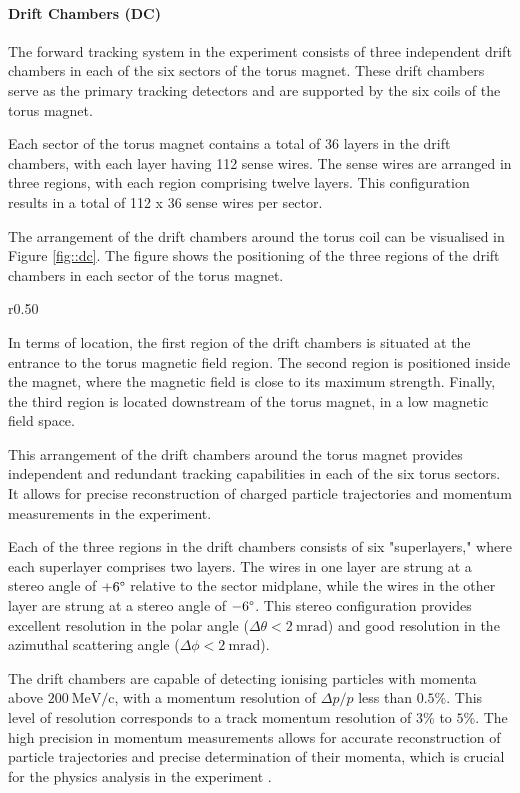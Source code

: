 \paragraph{Drift Chambers (DC)}
\label{par::dc}
    The forward tracking system in the experiment consists of three independent drift chambers in each of the six sectors of the torus magnet.
    These drift chambers serve as the primary tracking detectors and are supported by the six coils of the torus magnet.

    Each sector of the torus magnet contains a total of 36 layers in the drift chambers, with each layer having 112 sense wires.
    The sense wires are arranged in three regions, with each region comprising twelve layers.
    This configuration results in a total of 112 x 36 sense wires per sector.

    The arrangement of the drift chambers around the torus coil can be visualised in Figure \ref{fig::dc}.
    The figure shows the positioning of the three regions of the drift chambers in each sector of the torus magnet.

    \begin{wrapfigure}{r}{0.50\textwidth}
        \centering{}
        \caption[DC]{Drift Chambers render.
        Each of the DC regions are denoted as R1, R2, and R3 in the figure.
        Source: \hyperlink{jlab.org/physics/hall-b/clas12}{CLAS12 wiki}.}
        \label{fig::dc}
    \end{wrapfigure}

    In terms of location, the first region of the drift chambers is situated at the entrance to the torus magnetic field region.
    The second region is positioned inside the magnet, where the magnetic field is close to its maximum strength.
    Finally, the third region is located downstream of the torus magnet, in a low magnetic field space.

    This arrangement of the drift chambers around the torus magnet provides independent and redundant tracking capabilities in each of the six torus sectors.
    It allows for precise reconstruction of charged particle trajectories and momentum measurements in the experiment.

    Each of the three regions in the drift chambers consists of six "superlayers," where each superlayer comprises two layers.
    The wires in one layer are strung at a stereo angle of $+6\degree$ relative to the sector midplane, while the wires in the other layer are strung at a stereo angle of $-6\degree$.
    This stereo configuration provides excellent resolution in the polar angle ($\Delta\theta < 2 ~\text{mrad}$) and good resolution in the azimuthal scattering angle ($\Delta\phi < 2 ~\text{mrad}$).

    The drift chambers are capable of detecting ionising particles with momenta above $200 ~\text{MeV}/\text{c}$, with a momentum resolution of $\Delta p/p$ less than $0.5\%$. This level of resolution corresponds to a track momentum resolution of $3\%$ to $5\%$.
    The high precision in momentum measurements allows for accurate reconstruction of particle trajectories and precise determination of their momenta, which is crucial for the physics analysis in the experiment \cite{mestayer2020}.
